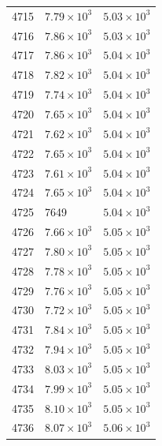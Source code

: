 \begin{table}[H]
\begin{tabular}{lll}
4715 & $\displaystyle 7.79 \times 10^{3}$ & $\displaystyle 5.03 \times 10^{3}$ \\
4716 & $\displaystyle 7.86 \times 10^{3}$ & $\displaystyle 5.03 \times 10^{3}$ \\
4717 & $\displaystyle 7.86 \times 10^{3}$ & $\displaystyle 5.04 \times 10^{3}$ \\
4718 & $\displaystyle 7.82 \times 10^{3}$ & $\displaystyle 5.04 \times 10^{3}$ \\
4719 & $\displaystyle 7.74 \times 10^{3}$ & $\displaystyle 5.04 \times 10^{3}$ \\
4720 & $\displaystyle 7.65 \times 10^{3}$ & $\displaystyle 5.04 \times 10^{3}$ \\
4721 & $\displaystyle 7.62 \times 10^{3}$ & $\displaystyle 5.04 \times 10^{3}$ \\
4722 & $\displaystyle 7.65 \times 10^{3}$ & $\displaystyle 5.04 \times 10^{3}$ \\
4723 & $\displaystyle 7.61 \times 10^{3}$ & $\displaystyle 5.04 \times 10^{3}$ \\
4724 & $\displaystyle 7.65 \times 10^{3}$ & $\displaystyle 5.04 \times 10^{3}$ \\
4725 & 7649 & $\displaystyle 5.04 \times 10^{3}$ \\
4726 & $\displaystyle 7.66 \times 10^{3}$ & $\displaystyle 5.05 \times 10^{3}$ \\
4727 & $\displaystyle 7.80 \times 10^{3}$ & $\displaystyle 5.05 \times 10^{3}$ \\
4728 & $\displaystyle 7.78 \times 10^{3}$ & $\displaystyle 5.05 \times 10^{3}$ \\
4729 & $\displaystyle 7.76 \times 10^{3}$ & $\displaystyle 5.05 \times 10^{3}$ \\
4730 & $\displaystyle 7.72 \times 10^{3}$ & $\displaystyle 5.05 \times 10^{3}$ \\
4731 & $\displaystyle 7.84 \times 10^{3}$ & $\displaystyle 5.05 \times 10^{3}$ \\
4732 & $\displaystyle 7.94 \times 10^{3}$ & $\displaystyle 5.05 \times 10^{3}$ \\
4733 & $\displaystyle 8.03 \times 10^{3}$ & $\displaystyle 5.05 \times 10^{3}$ \\
4734 & $\displaystyle 7.99 \times 10^{3}$ & $\displaystyle 5.05 \times 10^{3}$ \\
4735 & $\displaystyle 8.10 \times 10^{3}$ & $\displaystyle 5.05 \times 10^{3}$ \\
4736 & $\displaystyle 8.07 \times 10^{3}$ & $\displaystyle 5.06 \times 10^{3}$ \\

\end{tabular}
\end{table}
